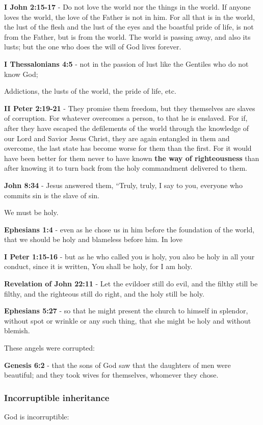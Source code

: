 \documentclass[11pt]{article}
\begin{document}
\textbf{I John 2:15-17} - Do not love the world nor the things in the world. If anyone loves the world, the love of the Father is not in him. For all that is in the world, the lust of the flesh and the lust of the eyes and the boastful pride of life, is not from the Father, but is from the world. The world is passing away, and also its lusts; but the one who does the will of God lives forever.

\textbf{I Thessalonians 4:5} - not in the passion of lust like the Gentiles who do not know God;

Addictions, the lusts of the world, the pride of life, etc.

\textbf{II Peter 2:19-21} - They promise them freedom, but they themselves are slaves of corruption. For whatever overcomes a person, to that he is enslaved. For if, after they have escaped the defilements of the world through the knowledge of our Lord and Savior Jesus Christ, they are again entangled in them and overcome, the last state has become worse for them than the first. For it would have been better for them never to have known \textbf{the way of righteousness} than after knowing it to turn back from the holy commandment delivered to them.

\textbf{John 8:34} - Jesus answered them, “Truly, truly, I say to you, everyone who commits sin is the slave of sin.

We must be holy.

\textbf{Ephesians 1:4} - even as he chose us in him before the foundation of the world, that we should be holy and blameless before him. In love

\textbf{I Peter 1:15-16} - but as he who called you is holy, you also be holy in all your conduct, since it is written, You shall be holy, for I am holy.

\textbf{Revelation of John 22:11} - Let the evildoer still do evil, and the filthy still be filthy, and the righteous still do right, and the holy still be holy.

\textbf{Ephesians 5:27} - so that he might present the church to himself in splendor, without spot or wrinkle or any such thing, that she might be holy and without blemish.

These angels were corrupted:

\textbf{Genesis 6:2} - that the sons of God saw that the daughters of men were beautiful; and they took wives for themselves, whomever they chose.

\subsubsection{Incorruptible inheritance}
\label{sec:org2174158}
God is incorruptible:
\end{document}
